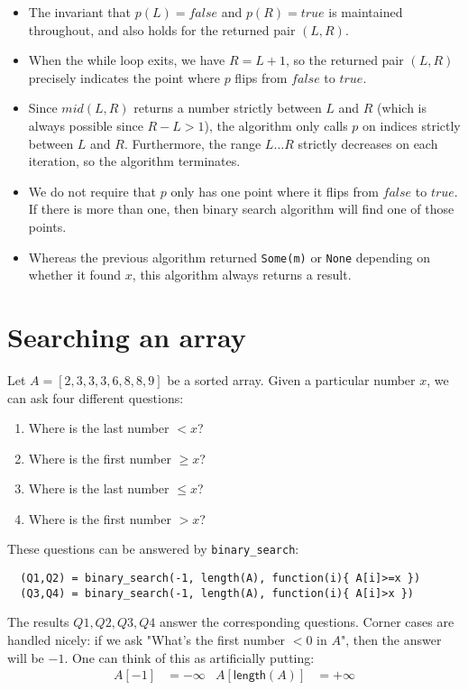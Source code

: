 \documentclass[a4paper, 11pt]{article}
\begin{document}
\begin{itemize}
  \item The invariant that $p(L) = false$ and $p(R) = true$ is maintained throughout, and also holds for the returned pair $(L,R)$.
  \item When the while loop exits, we have $R = L + 1$, so the returned pair $(L,R)$ precisely indicates the point where $p$ flips from $false$ to $true$.
  \item Since $mid(L,R)$ returns a number strictly between $L$ and $R$ (which is always possible since $R - L > 1$), the algorithm only calls $p$ on indices strictly between $L$ and $R$. Furthermore, the range $L\dots R$ strictly decreases on each iteration, so the algorithm terminates.
  \item We do not require that $p$ only has one point where it flips from $false$ to $true$. If there is more than one, then binary search algorithm will find one of those points.
  \item Whereas the previous algorithm returned \lstinline|Some(m)| or \lstinline|None| depending on whether it found $x$, this algorithm always returns a result.
\end{itemize}

\section{Searching an array}

Let $A = [2,3,3,3,6,8,8,9]$ be a sorted array. Given a particular number $x$, we can ask four different questions:

\begin{enumerate}[(Q1)]
  \item Where is the last number $<x$?
  \item Where is the first number $\geq x$?
  \item Where is the last number $\leq x$?
  \item Where is the first number $>x$?
\end{enumerate}

\noindent These questions can be answered by \lstinline|binary_search|:

\begin{lstlisting}
  (Q1,Q2) = binary_search(-1, length(A), function(i){ A[i]>=x })
  (Q3,Q4) = binary_search(-1, length(A), function(i){ A[i]>x })
\end{lstlisting}

\noindent The results $Q1,Q2,Q3,Q4$ answer the corresponding questions. Corner cases are handled nicely: if we ask "What's the first number $<0$ in $A$", then the answer will be $-1$. One can think of this as artificially putting:
\begin{align*}
  A[-1] &= -\infty & A[\mathsf{length}(A)] &= +\infty
\end{align*}
\end{document}
